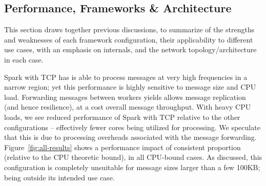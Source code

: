 \documentclass[conference]{IEEEtran}
\begin{document}
\subsection{Performance, Frameworks \& Architecture}

This section draws together previous discussions, to summarize of the strengths and weaknesses of each framework configuration, their applicability to different use cases, with an emphasis on internals, and the network topology/architecture in each case. 


Spark with TCP has is able to process messages at very high frequencies in a narrow region; yet this performance is highly sensitive to message size and CPU load. Forwarding messages between workers yields allows message replication (and hence resilience), at a cost overall message throughput.
With heavy CPU loads, we see reduced performance of Spark with TCP relative to the other configurations -- effectively fewer cores being utilized for processing. We speculate that this is due to processing overheads associated with the message forwarding. Figure~\ref{fig:all-results} shows a performance impact of consistent proportion (relative to the CPU theoretic bound), in all CPU-bound cases. As discussed, this configuration is completely unsuitable for message sizes larger than a few 100KB; being outside its intended use case.
\end{document}
